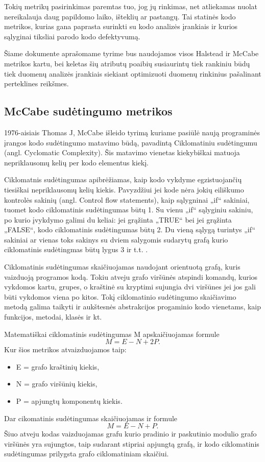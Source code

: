 \documentclass{VUMIFPSbakalaurinis}
\begin{document}
Tokių metrikų pasirinkimas paremtas tuo, jog jų rinkimas, net atliekamas nuolat nereikalauja daug papildomo laiko, išteklių ar pastangų. Tai statinės kodo metrikos, kurias gana paprasta surinkti su kodo analizės įrankiais ir kurios sąlyginai tiksliai parodo kodo defektyvumą.

Šiame dokumente aprašomame tyrime bus naudojamos visos Halstead ir McCabe metrikos kartu, bei keletas šių atributų poaibių susiaurintų tiek rankiniu būdų tiek duomenų analizės įrankiais siekiant optimizuoti duomenų rinkinius pašalinant perteklines reikšmes.

\subsection{McCabe sudėtingumo metrikos}
1976-aisiais Thomas J, McCabe išleido tyrimą kuriame pasiūlė naują programinės įrangos kodo sudėtingumo matavimo būdą, pavadintą Ciklomatiniu sudėtingumu (angl. Cyclomatic Complexity). Šis matavimo vienetas kiekybiškai matuoja nepriklausomų kelių per kodo elementus kiekį.

Ciklomatnis sudėtingumas apibrėžiamas, kaip kodo vykdyme egzistuojančių tiesiškai nepriklausomų kelių kiekis. Pavyzdžiui jei kode nėra jokių eiliškumo kontrolės sakinių (angl. Control flow statements), kaip sąlygninai „if“ sakiniai, tuomet kodo ciklomatinis sudėtingumas būtų 1. Su vienu „if“ sąlyginiu sakiniu, po kurio įvykdymo galimi du keliai: jei grąžinta „TRUE“ bei jei grąžinta „FALSE“, kodo ciklomatinis sudėtingumas būtų 2. Du vieną sąlygą turintys „if“ sakiniai ar vienas toks sakinys su dviem salygomis sudarytų grafą kurio ciklomatinis sudėtingmas būtų lygus 3 ir t.t. \cite{McCabe:1976:CM:800253.807712}.

Ciklomatinis sudėtingumas skaičiuojamas naudojant orientuotą grafą, kuris vaizduoją programos kodą. Tokiu atveju grafo viršūnės atspindi komandų, kurios vykdomos kartu, grupes, o kraštinė su kryptimi sujungia dvi viršūnes jei jos gali būti vykdomos viena po kitos. Tokį ciklomatinio sudėtingumo skaičiavimo metodą galima taikyti ir aukštesnės abstrakcijos progaminio kodo vienetams, kaip funkcijos, metodai, klasės ir kt.

Matematiškai ciklomatinis sudėtingumas M apskaičiuojamas formule \[M = E - N + 2P.\] Kur šios metrikos atvaizduojamos taip:
\begin{itemize}  
\item[] E = grafo kraštinių kiekis,
\item[] N = grafo viršūnių kiekis,
\item[] P = apjungtų komponentų kiekis.
\end{itemize} 
Dar cikomatinis sudėtingumas skaičiuojamas ir formule \[M = E - N + P.\] Šiuo atveju kodas vaizduojamas grafu kurio pradinio ir paskutinio modulio grafo viršūnės yra sujungtos, taip sudarant stipriai apjungtą grafą, ir kodo ciklomatinis sudėtingumas prilygsta grafo ciklomatiniam skaičiui.
\end{document}
